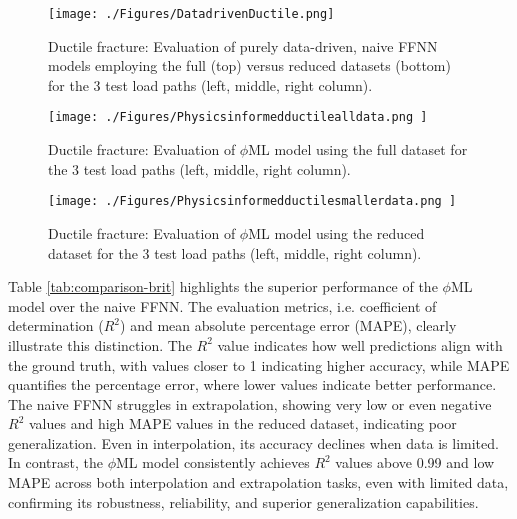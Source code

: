 \documentclass[final,3p,times]{elsarticle}
\begin{document}

\begin{figure}[b]%
\centering
%
\texttt{[image: ./Figures/DatadrivenDuctile.png]} 
%
\caption{
Ductile fracture: Evaluation of purely data-driven, naive FFNN models employing the full (top) versus reduced datasets (bottom) for the 3 test load paths (left, middle, right column).}
\label{ductile-classical-ML}%
\end{figure}%
%


\begin{figure}[b]%
\centering
%
 \texttt{[image: ./Figures/Physicsinformedductilealldata.png
]} 
%
\caption{
Ductile fracture: Evaluation of $\phi$ML model using the full dataset for the 3 test load paths (left, middle, right column).}
\label{ductile-pML-full}%
\end{figure}%


\begin{figure}[t]%
\centering
%
 \texttt{[image: ./Figures/Physicsinformedductilesmallerdata.png
]} 
%
\caption{
Ductile fracture: Evaluation of $\phi$ML model using the reduced dataset for the 3 test load paths (left, middle, right column).}
\label{ductile-pML-reduced}%
\end{figure}%


Table \ref{tab:comparison-brit} highlights the superior performance of the $\phi$ML model over the naive FFNN. The evaluation metrics, i.e. coefficient of determination ($R^2$) and mean absolute percentage error (MAPE), clearly illustrate this distinction. The $R^2$ value indicates how well predictions align with the ground truth, with values closer to 1 indicating higher accuracy, while MAPE quantifies the percentage error, where lower values indicate better performance. The naive FFNN struggles in extrapolation, showing very low or even negative $R^2$ values and high MAPE values in the reduced dataset, indicating poor generalization. Even in interpolation, its accuracy declines when data is limited.  In contrast, the $\phi$ML model consistently achieves $R^2$ values above 0.99 and low MAPE across both interpolation and extrapolation tasks, even with limited data, confirming its robustness, reliability, and superior generalization capabilities.
\end{document}

